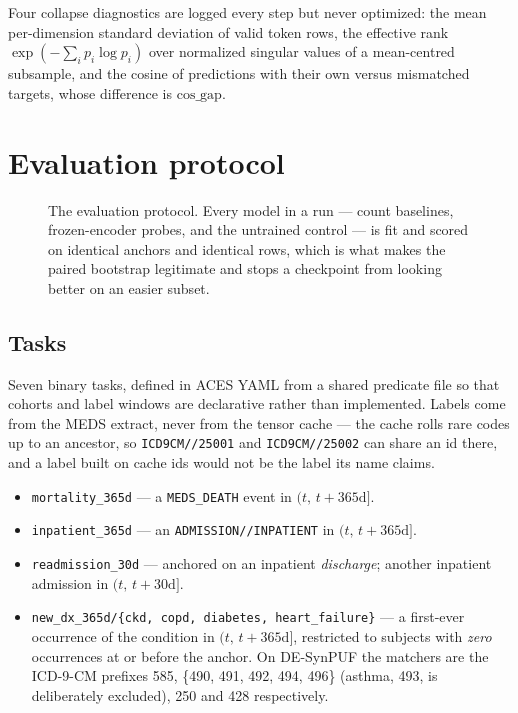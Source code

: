 \documentclass[11pt,a4paper]{article}
\newcommand{\code}[1]{\texttt{\small #1}}
\begin{document}
Four collapse diagnostics are logged every step but never optimized: the mean
per-dimension standard deviation of valid token rows, the effective rank
$\exp(-\sum_i p_i \log p_i)$ over normalized singular values of a mean-centred
subsample, and the cosine of predictions with their own versus mismatched
targets, whose difference is $\mathrm{cos\_gap}$.

\section{Evaluation protocol}
\label{sec:eval}

\begin{figure}[t]
\centering
\resizebox{\textwidth}{!}{}
\caption{The evaluation protocol. Every model in a run --- count baselines,
frozen-encoder probes, and the untrained control --- is fit and scored on
identical anchors and identical rows, which is what makes the paired bootstrap
legitimate and stops a checkpoint from looking better on an easier subset.}
\label{fig:protocol}
\end{figure}

\subsection{Tasks}

Seven binary tasks, defined in ACES YAML from a shared predicate file so that
cohorts and label windows are declarative rather than implemented. Labels come
from the MEDS extract, never from the tensor cache --- the cache rolls rare
codes up to an ancestor, so \code{ICD9CM//25001} and \code{ICD9CM//25002} can
share an id there, and a label built on cache ids would not be the label its
name claims.

\begin{itemize}[leftmargin=*,itemsep=2pt,topsep=3pt]
\item \code{mortality\_365d} --- a \code{MEDS\_DEATH} event in
      $(t,\, t+365\text{d}]$.
\item \code{inpatient\_365d} --- an \code{ADMISSION//INPATIENT} in
      $(t,\, t+365\text{d}]$.
\item \code{readmission\_30d} --- anchored on an inpatient \emph{discharge};
      another inpatient admission in $(t,\, t+30\text{d}]$.
\item \code{new\_dx\_365d/\{ckd, copd, diabetes, heart\_failure\}} --- a first-ever
      occurrence of the condition in $(t,\, t+365\text{d}]$, restricted to
      subjects with \emph{zero} occurrences at or before the anchor. On
      DE-SynPUF the matchers are the ICD-9-CM prefixes 585, \{490, 491, 492,
      494, 496\} (asthma, 493, is deliberately excluded), 250 and 428
      respectively.
\end{itemize}
\end{document}
